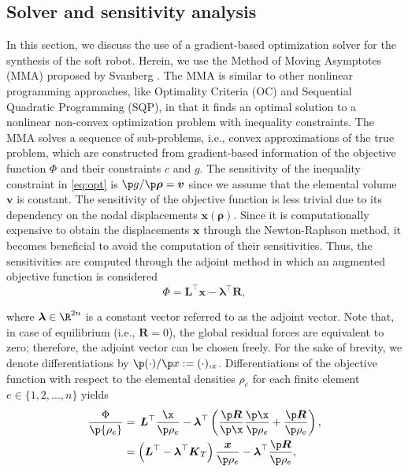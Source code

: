 \subsection{Solver and sensitivity analysis}
In this section, we discuss the use of a gradient-based optimization solver for the synthesis of the soft robot. Herein, we use the Method of Moving Asymptotes (MMA) proposed by Svanberg \cite{Svanberg1987}. The MMA is similar to other nonlinear programming approaches, like Optimality Criteria (OC) and Sequential Quadratic Programming (SQP), in that it finds an optimal solution to a nonlinear non-convex optimization problem with inequality constraints. The MMA solves a sequence of sub-problems, i.e., convex approximations of the true problem, which are constructed from gradient-based information of the objective function $\Phi$ and their constraints $c$ and $g$. The sensitivity of the inequality constraint in \eqref{eq:opt} is $\p g / \p \boldsymbol{\rho} = \boldsymbol{v}$ since we assume that the elemental volume $\boldsymbol{v}$ is constant. The sensitivity of the objective function is less trivial due to its dependency on the nodal displacements $\boldsymbol{x}(\boldsymbol{\rho})$. Since it is computationally expensive to obtain the displacements $\boldsymbol{x}$ through the Newton-Raphson method, it becomes beneficial to avoid the computation of their sensitivities. Thus, the sensitivities are computed through the adjoint method in which an augmented objective function is considered
\begin{equation}
{\Phi} = \boldsymbol{L}^\top \boldsymbol{x} - \boldsymbol{\lambda}^\top \boldsymbol{R},
\end{equation}

\noindent where $\boldsymbol{\lambda} \in \R^{2n}$ is a constant vector referred to as the adjoint vector. Note that, in case of equilibrium (i.e., $\boldsymbol{R} = 0$), the global residual forces are equivalent to zero; therefore, the adjoint vector can be chosen freely. For the sake of brevity, we denote differentiations by $\p(\cdot)/\p x := (\cdot),_{x}$. Differentiations of the objective function with respect to the elemental densities $\rho_e$ for each finite element $e \in \{1,2,...,n\}$ yields
\begin{align}
\frac{\Phi}{\p {\rho_e}} & = \,\boldsymbol{L}^\top \frac{\x}{\p \rho_e} - \boldsymbol{\lambda}^\top\left( \frac{\p \boldsymbol{R}}{ \p \x} \frac{\p \x}{\p \rho_e} + \frac{\p \boldsymbol{R}}{ \p \rho_e} \right), \notag \\
 & = \left(\boldsymbol{L}^\top - \boldsymbol{\lambda}^\top \boldsymbol{K}_T \right) \frac{\boldsymbol{x}}{\p \rho_e} - \boldsymbol{\lambda}^\top \frac{\p \boldsymbol{R}}{\p \rho_e},  \label{eq:sen_deriv} 
\end{align}

